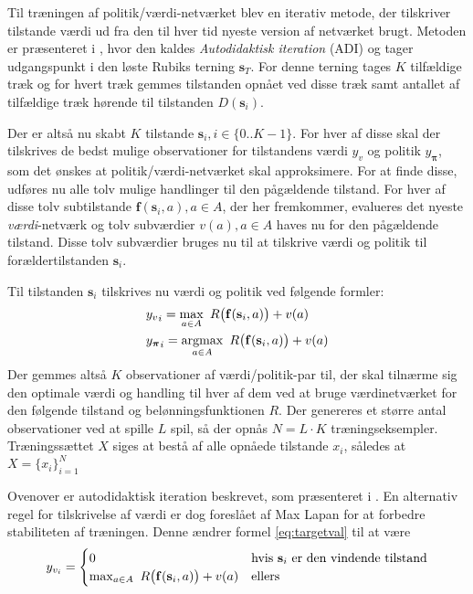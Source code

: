 \documentclass[../main.tex]{subfiles}
\begin{document}
Til træningen af politik/værdi-netværket blev en iterativ metode, der tilskriver tilstande værdi ud fra den til hver tid nyeste version af netværket brugt. 
Metoden er præsenteret i \cite[4.1]{HumansBeGone}, hvor den kaldes \textit{Autodidaktisk iteration} (ADI) og tager udgangspunkt i den løste Rubiks terning \(\mathbf s_T\).
For denne terning tages \(K\) tilfældige træk og for hvert træk gemmes tilstanden opnået ved disse træk samt antallet af tilfældige træk hørende til tilstanden \(D(\mathbf s_i)\). 

Der er altså nu skabt \(K\) tilstande \(\mathbf{s}_{i}, i\in\{0..K-1\}\). For hver af disse skal der tilskrives de bedst mulige observationer for tilstandens værdi \(y_v\) og politik \(y_{\bm \pi }\), som det ønskes at politik/værdi-netværket skal approksimere.
For at finde disse, udføres nu alle tolv mulige handlinger til den pågældende tilstand. For hver af disse tolv subtilstande \(\mathbf f(\mathbf s_i, a), a\in A\), der her fremkommer, evalueres det nyeste \textit{værdi}-netværk og tolv subværdier \(v(a), a\in A\) haves nu for den pågældende tilstand.
Disse tolv subværdier bruges nu til at tilskrive værdi og politik til forældertilstanden \(\mathbf s _i\).	 

Til tilstanden \(\mathbf s _i\) tilskrives nu værdi og politik ved følgende formler:
\begin{align}
	&{y_{v}}_i= \operatorname*{max}_{a\in A}\  R\big(\mathbf f(\mathbf s_i, a)\big)+v(a)\label{eq:targetval}
	\\
	& {y_{\bm \pi }}_i = \operatorname*{argmax}_{a\in A} \  R\big(\mathbf f(\mathbf s_i, a)\big)+v(a) \label{eq:targetpi}
\end{align}
Der gemmes altså \(K\) observationer af værdi/politik-par til, der skal tilnærme sig den optimale værdi og handling til hver af dem ved at bruge værdinetværket for den følgende tilstand og belønningsfunktionen \(R\). 
Der genereres et større antal observationer ved at spille \(L\) spil, så der opnås \(N=L\cdot K\) træningseksempler.
Træningssættet $ X $ siges at bestå af alle opnåede tilstande $ x_i $, således at $ X=\{x_i\}_{i=1}^N $

Ovenover er autodidaktisk iteration beskrevet, som præsenteret i \cite{HumansBeGone}. En alternativ regel for tilskrivelse af værdi er dog foreslået af Max Lapan \cite{RubiksMedium} for at forbedre stabiliteten af træningen. Denne ændrer formel \eqref{eq:targetval} til at være
\begin{equation}\label{eq:lapantargeval}
y_{v_i}= 
\begin{cases}
0 & \text{hvis \(\mathbf s_i\) er den vindende tilstand}\\
\operatorname*{max}_{a\in A}\  R\big(\mathbf f(\mathbf s_i, a)\big)+v(a) &\text{ellers}
\end{cases}
\end{equation}
\end{document}
